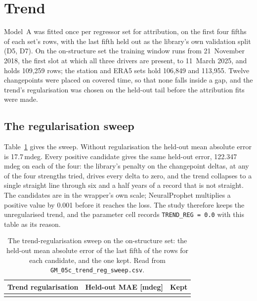 \documentclass[11pt,a4paper]{article}
\begin{document}
\section{Trend}
\label{sec:trend}

Model~A was fitted once per regressor set for attribution, on the first four
fifths of each set's rows, with the last fifth held out as the library's own
validation split (D5, D7). On the on-structure set the training window runs
from 21~November 2018, the first slot at which all three drivers are present,
to 11~March 2025, and holds 109,259 rows; the station and ERA5 sets hold
106,849 and 113,955. Twelve changepoints were placed on covered time, so that
none falls inside a gap, and the trend's regularisation was chosen on the
held-out tail before the attribution fits were made.

\subsection{The regularisation sweep}

Table~\ref{tab:trend-reg} gives the sweep. Without regularisation the held-out
mean absolute error is 17.7\,mdeg. Every positive candidate gives the same
held-out error, 122.347\,mdeg on each of the four: the library's penalty on the changepoint
deltas, at any of the four strengths tried, drives every delta to zero, and
the trend collapses to a single straight line through six and a half years of
a record that is not straight. The candidates are in the wrapper's own scale;
NeuralProphet multiplies a positive value by 0.001 before it reaches the loss.
The study therefore keeps the unregularised trend, and the parameter cell
records \texttt{TREND\_REG = 0.0} with this table as its reason.

\begin{table}[H]
\centering
\caption{The trend-regularisation sweep on the on-structure set: the held-out
mean absolute error of the last fifth of the rows for each candidate, and the
one kept. Read from \texttt{GM\_05c\_trend\_reg\_sweep.csv}.}
\label{tab:trend-reg}
\begin{tabular}{rrl}
\toprule
Trend regularisation & Held-out MAE [mdeg] & Kept \\
\midrule
\\
\bottomrule
\end{tabular}
\end{table}
\end{document}

